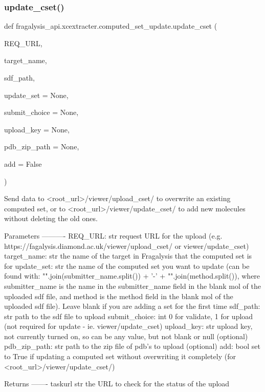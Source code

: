 \subsubsection{\texorpdfstring{update\+\_\+cset()}{update\_cset()}}
{\footnotesize\ttfamily def fragalysis\+\_\+api.\+xcextracter.\+computed\+\_\+set\+\_\+update.\+update\+\_\+cset (\begin{DoxyParamCaption}\item[{}]{R\+E\+Q\+\_\+\+U\+RL,  }\item[{}]{target\+\_\+name,  }\item[{}]{sdf\+\_\+path,  }\item[{}]{update\+\_\+set = {\ttfamily \textquotesingle{}None\textquotesingle{}},  }\item[{}]{submit\+\_\+choice = {\ttfamily None},  }\item[{}]{upload\+\_\+key = {\ttfamily None},  }\item[{}]{pdb\+\_\+zip\+\_\+path = {\ttfamily None},  }\item[{}]{add = {\ttfamily False} }\end{DoxyParamCaption})}

\begin{DoxyVerb}Send data to <root_url>/viewer/upload_cset/ to overwrite an existing computed set, or to 
<root_url>/viewer/update_cset/ to add new molecules without deleting the old ones.

Parameters
----------
REQ_URL: str
    request URL for the upload (e.g. https://fagalysis.diamond.ac.uk/viewer/upload_cset/ or viewer/update_cset)
target_name: str
    the name of the target in Fragalysis that the computed set is for
update_set: str
    the name of the computed set you want to update 
    (can be found with: "".join(submitter_name.split()) + '-' + "".join(method.split()),
    where submitter_name is the name in the submitter_name field in the blank mol of the uploaded sdf file,
    and method is the method field in the blank mol of the uploaded sdf file). Leave blank if you are adding
    a set for the first time
sdf_path: str
    path to the sdf file to upload
submit_choice: int
    0 for validate, 1 for upload (not required for update - ie. viewer/update_cset)
upload_key: str
    upload key, not currently turned on, so can be any value, but not blank or null (optional)
pdb_zip_path: str
    path to the zip file of pdb's to upload (optional)
add: bool
    set to True if updating a computed set without overwriting it completely (for <root_url>/viewer/update_cset/)
    
Returns
-------
taskurl str
    the URL to check for the status of the upload
\end{DoxyVerb}
 

